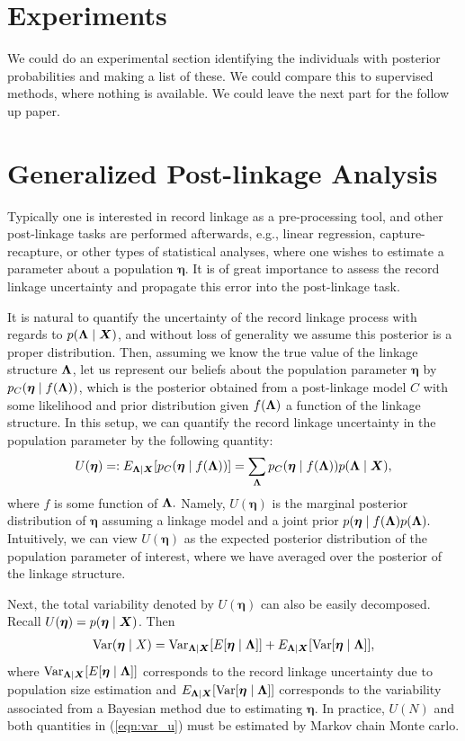 \documentclass[11pt]{article}
\newcommand{\Var}{\text{Var}}
\newcommand{\pop}{\boldsymbol{\eta}}
\begin{document}
\section{Experiments}
We could do an experimental section identifying the individuals with posterior probabilities and making a list of these. We could compare this to supervised methods, where nothing is available. We could leave the next part for the follow up paper. 


\newpage

\section{Generalized Post-linkage Analysis}
\label{sec:post-link}

Typically one is interested in record linkage as a pre-processing tool, and other post-linkage tasks are performed afterwards, e.g., 
linear regression, capture-recapture, or other types of statistical analyses, where one wishes to estimate a parameter about a population $\pop$. It is of great importance to assess the record linkage uncertainty and propagate this error into the post-linkage task. 

It is natural to quantify the uncertainty of the record linkage process with regards to $p(\boldsymbol{\Lambda} \mid \bm{X})$, and without loss of generality we assume this posterior is a proper distribution. Then, assuming we know the true value of the linkage structure $\boldsymbol{\Lambda}$, let us represent our beliefs about the population parameter $\pop$ by $p_C(\pop \mid f(\lam))$, which is the posterior obtained from a post-linkage model $C$ with some likelihood and prior distribution given $f(\boldsymbol{\Lambda})$ a function of the linkage structure. In this setup, we can quantify the record linkage uncertainty in the population parameter by the following quantity:
\begin{align}
\label{eqn:average-linkage}
U(\pop) =: E_{\lam \mid \bX} [p_C(\pop \mid f(\lam))] = \sum_{\lam} p_C(\pop\mid f(\lam)) p(\lam \mid \bX),
\end{align}
where $f$ is some function of $\boldsymbol{\Lambda}.$ Namely, $U(\pop)$ is the marginal posterior distribution of $\pop$ assuming a linkage model and a joint prior $p(\pop \mid f(\lam) p(\lam).$ Intuitively, we can view $U(\pop)$ as the expected posterior distribution of the population parameter of interest, where we have averaged over the posterior of the linkage structure.

Next, the total variability denoted by $U(\pop)$ can also be easily decomposed. Recall $U(\pop) = p(\pop \mid \bX)$. Then
\begin{align}
\Var (\pop \mid X) = \Var_{\lam \mid \bX} [E[\pop \mid \lam ]] + E_{\lam \mid \bX} [\Var[\pop \mid \lam ]],
\label{eqn:var_u}
\end{align}
where $\Var_{\lam \mid \bX} [E[\pop \mid \lam ]]$ corresponds to the record linkage uncertainty due to population size estimation and  $E_{\lam \mid \bX} [\Var[\pop \mid \lam ]]$ corresponds to the variability associated from a Bayesian method due to estimating $\pop$. In practice, $U(N)$ and both quantities in (\ref{eqn:var_u}) must be estimated by Markov chain Monte carlo.
\end{document}
